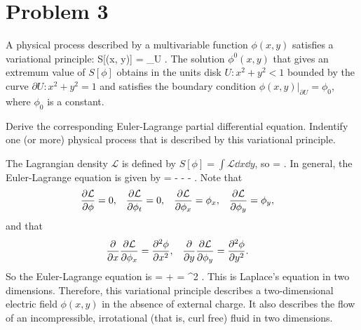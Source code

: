 \newcommand{\phixy}{\phi(x, y)}
\newcommand{\phio}{\phi_0}
\newcommand{\phioxy}{\phi^0(x, y)}

\newcommand{\dU}{\partial U}
\newcommand{\Ld}{\mathcal{L}}

\newcommand{\phit}{\phi_t}
\newcommand{\phix}{\phi_x}
\newcommand{\phiy}{\phi_y}

\section{Problem 3}
\begin{statement}
	A physical process described by a multivariable function $\phixy$ satisfies a variational principle:
	\beq
		S[\phixy] =  \int_U   .
	\eeq
	The solution $\phioxy$ that gives an extremum value of $S[\phi]$ obtains in the units disk $U : x^2 + y^2 < 1$ bounded by the curve $\dU : x^2 + y^2 = 1$ and satisfies the boundary condition $\phixy |_{\dU} = \phio$, where $\phio$ is a constant.
	
	Derive the corresponding Euler-Lagrange partial differential equation.  Indentify one (or more) physical process that is described by this variational principle.
\end{statement}

\begin{solution}
	The Lagrangian density $\Ld$ is defined by $S[\phi] = \int \Ld \dd{x} \dd{y}$, so
	\beq
		\Ld =  .
	\eeq
	In general, the Euler-Lagrange equation is given by
	 = \pdv{\Ld}{\phi} -  \pdv{\Ld}{\phit} -  \pdv{\Ld}{\phix} -  \pdv{\Ld}{\phiy}.
	\eeq
	Note that
	\begin{align*}
		\pdv{\Ld}{\phi} &= 0, &
		\pdv{\Ld}{\phit} &= 0, &
		\pdv{\Ld}{\phix} &= \phix, &
		\pdv{\Ld}{\phiy} &= \phiy,
	\end{align*}
	and that
	\begin{align*}
		\pdv{}{x} \pdv{\Ld}{\phix} &= \pdv[2]{\phi}{x}, &
		\pdv{}{y} \pdv{\Ld}{\phiy} &= \pdv[2]{\phi}{y}.
	\end{align*}
	So the Euler-Lagrange equation is
	 =  +  = \nabla^2 \phi.
	\eeq
	This is Laplace's equation in two dimensions.  Therefore, this variational principle describes a two-dimensional electric field $\phixy$ in the absence of external charge.  It also describes the flow of an incompressible, irrotational (that is, curl free) fluid in two dimensions.
\end{solution}